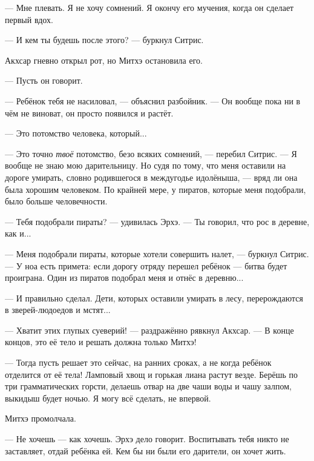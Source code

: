 --- Мне плевать.
Я не хочу сомнений.
Я окончу его мучения, когда он сделает первый вдох.

--- И кем ты будешь после этого? --- буркнул Ситрис.

Акхсар гневно открыл рот, но Митхэ остановила его.

--- Пусть он говорит.

--- Ребёнок тебя не насиловал, --- объяснил разбойник.
--- Он вообще пока ни в чём не виноват, он просто появился и растёт.

--- Это потомство человека, который...

--- Это точно \emph{твоё} потомство, безо всяких сомнений, --- перебил Ситрис.
--- Я вообще не знаю мою дарительницу.
Но судя по тому, что меня оставили на дороге умирать, словно родившегося в междугодье идолёныша\FM, --- вряд ли она была хорошим человеком.
По крайней мере, у пиратов, которые меня подобрали, было больше человечности.

--- Тебя подобрали пираты? --- удивилась Эрхэ.
--- Ты говорил, что рос в деревне, как и...

--- Меня подобрали пираты, которые хотели совершить налет, --- буркнул Ситрис.
--- У ноа есть примета: если дорогу отряду перешел ребёнок --- битва будет проиграна.
Один из пиратов подобрал меня и отнёс в деревню...

--- И правильно сделал.
Дети, которых оставили умирать в лесу, перерождаются в зверей-людоедов и мстят...

--- Хватит этих глупых суеверий! --- раздражённо рявкнул Акхсар.
--- В конце концов, это её тело и решать должна только Митхэ!

--- Тогда пусть решает это сейчас, на ранних сроках, а не когда ребёнок отделится от её тела!
Ламповый хвощ и горькая лиана растут везде.
Берёшь по три грамматических горсти\FM, делаешь отвар на две чаши воды и чашу залпом, выкидыш будет ночью.
Я могу всё сделать, не впервой.

Митхэ промолчала.

--- Не хочешь --- как хочешь.
Эрхэ дело говорит.
Воспитывать тебя никто не заставляет, отдай ребёнка ей.
Кем бы ни были его дарители, он хочет жить.

